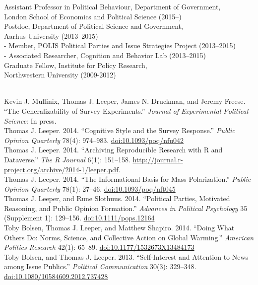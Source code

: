 \documentclass[12pt]{article}
\renewcommand{\section}[1]{\pagebreak[3]%
    \llap{\scshape\smash{\parbox[t]{\marginparwidth}{\raggedright {\color{lg}#1}}}}%
    \vspace{-\baselineskip}\par}
\newcommand{\topic}[1]{\pagebreak[3]\indent {\color{lg}{\footnotesize #1 }}\\}
\newcommand{\entry}[1]{\indent {\color{lg}\guillemotright}\hspace{2pt}#1\vspace{.25em}\\}
\newcommand{\subentry}[1]{{\color{lg}-} #1\vspace{.25em}\\}
\begin{document}
\section{Academic Appointments}
\entry{Assistant Professor in Political Behaviour, Department of Government,\\ London School of Economics and Political Science (2015--)}
\entry{Postdoc, Department of Political Science and Government,\\ Aarhus University (2013--2015)}
\subentry{Member, POLIS Political Parties and Issue Strategies Project (2013--2015)}
\subentry{Associated Researcher, Cognition and Behavior Lab (2013--2015)}
\entry{Graduate Fellow, Institute for Policy Research,\\ Northwestern University (2009-2012)}

\section{Publications}
\topic{Peer-Reviewed Publications}
\entry{Kevin J. Mullinix, Thomas J. Leeper, James N. Druckman, and Jeremy Freese. ``The Generalizability of Survey Experiments.'' {\em Journal of Experimental Political Science}: In press.}
\entry{Thomas J. Leeper. 2014. ``Cognitive Style and the Survey Response.'' {\em Public Opinion Quarterly} 78(4): 974--983. \href{http://dx.doi.org/10.1093/poq/nfu042}{doi:10.1093/poq/nfu042}}
\entry{Thomas J. Leeper. 2014. ``Archiving Reproducible Research with R and Dataverse.'' {\em The R Journal} 6(1): 151--158. \href{http://journal.r-project.org/archive/2014-1/leeper.pdf}{http://journal.r-project.org/archive/2014-1/leeper.pdf}.}
\entry{Thomas J. Leeper. 2014. ``The Informational Basis for Mass Polarization.'' {\em Public Opinion Quarterly} 78(1): 27--46. \href{http://dx.doi.org/10.1093/poq/nft045}{doi:10.1093/poq/nft045}}
\entry{Thomas J. Leeper, and Rune Slothuus. 2014. ``Political Parties, Motivated Reasoning, and Public Opinion Formation.'' {\em Advances in Political Psychology} 35 (Supplement 1): 129--156. \href{http://dx.doi.org/10.1111/pops.12164}{doi:10.1111/pops.12164}}
\entry{Toby Bolsen, Thomas J. Leeper, and Matthew Shapiro. 2014. ``Doing What Others Do: Norms, Science, and Collective Action on Global Warming.'' {\em American Politics Research} 42(1): 65--89. \href{http://dx.doi.org/10.1177/1532673X13484173}{doi:10.1177/1532673X13484173}}
\entry{Toby Bolsen, and Thomas J. Leeper. 2013. ``Self-Interest and Attention to News among Issue Publics.'' {\em Political Communication} 30(3): 329--348.\\ \href{http://dx.doi.org/10.1080/10584609.2012.737428}{doi:10.1080/10584609.2012.737428}}
\end{document}
